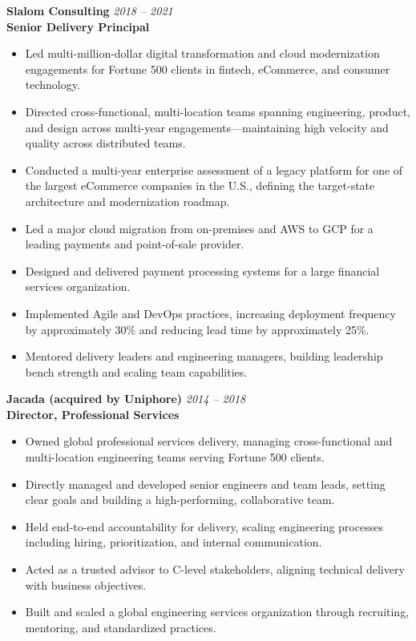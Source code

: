 \documentclass[11pt]{article}
\begin{document}
\vspace{6pt}

\pagebreak

\textbf{Slalom Consulting} \hfill \textit{2018 -- 2021} \\
\textbf{Senior Delivery Principal}

\begin{itemize}
  \item Led multi-million-dollar digital transformation and cloud modernization engagements for Fortune 500 clients in fintech, eCommerce, and consumer technology.
  \item Directed cross-functional, multi-location teams spanning engineering, product, and design across multi-year engagements---maintaining high velocity and quality across distributed teams.
  \item Conducted a multi-year enterprise assessment of a legacy platform for one of the largest eCommerce companies in the U.S., defining the target-state architecture and modernization roadmap.
  \item Led a major cloud migration from on-premises and AWS to GCP for a leading payments and point-of-sale provider.
  \item Designed and delivered payment processing systems for a large financial services organization.
  \item Implemented Agile and DevOps practices, increasing deployment frequency by approximately 30\% and reducing lead time by approximately 25\%.
  \item Mentored delivery leaders and engineering managers, building leadership bench strength and scaling team capabilities.
\end{itemize}

\vspace{6pt}

\textbf{Jacada (acquired by Uniphore)} \hfill \textit{2014 -- 2018} \\
\textbf{Director, Professional Services}

\begin{itemize}
  \item Owned global professional services delivery, managing cross-functional and multi-location engineering teams serving Fortune 500 clients.
  \item Directly managed and developed senior engineers and team leads, setting clear goals and building a high-performing, collaborative team.
  \item Held end-to-end accountability for delivery, scaling engineering processes including hiring, prioritization, and internal communication.
  \item Acted as a trusted advisor to C-level stakeholders, aligning technical delivery with business objectives.
  \item Built and scaled a global engineering services organization through recruiting, mentoring, and standardized practices.
\end{itemize}
\end{document}
